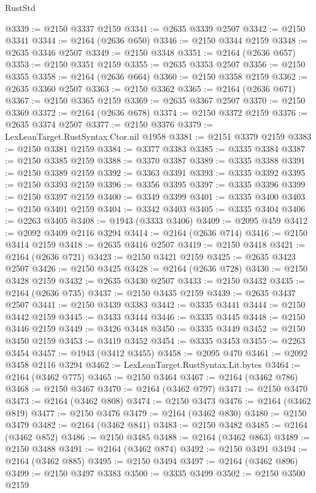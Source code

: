 \begin{lexlean}{RustStd}
\begin{coremodule}
@3339 := @2150 @3337 @2159
@3341 := @2635 @3339 @2507
@3342 := @2150 @3341
@3344 := @2164 (@2636 @650)
@3346 := @2150 @3344 @2159
@3348 := @2635 @3346 @2507
@3349 := @2150 @3348
@3351 := @2164 (@2636 @657)
@3353 := @2150 @3351 @2159
@3355 := @2635 @3353 @2507
@3356 := @2150 @3355
@3358 := @2164 (@2636 @664)
@3360 := @2150 @3358 @2159
@3362 := @2635 @3360 @2507
@3363 := @2150 @3362
@3365 := @2164 (@2636 @671)
@3367 := @2150 @3365 @2159
@3369 := @2635 @3367 @2507
@3370 := @2150 @3369
@3372 := @2164 (@2636 @678)
@3374 := @2150 @3372 @2159
@3376 := @2635 @3374 @2507
@3377 := @2150 @3376
@3379 := LexLeanTarget.RustSyntax.Ctor.nil @1958
@3381 := @2151 @3379 @2159
@3383 := @2150 @3381 @2159
@3384 := @3377 @3383
@3385 := @3335 @3384
@3387 := @2150 @3385 @2159
@3388 := @3370 @3387
@3389 := @3335 @3388
@3391 := @2150 @3389 @2159
@3392 := @3363 @3391
@3393 := @3335 @3392
@3395 := @2150 @3393 @2159
@3396 := @3356 @3395
@3397 := @3335 @3396
@3399 := @2150 @3397 @2159
@3400 := @3349 @3399
@3401 := @3335 @3400
@3403 := @2150 @3401 @2159
@3404 := @3342 @3403
@3405 := @3335 @3404
@3406 := @2263 @3405
@3408 := @1943 (@3333 @3406)
@3409 := @2095 @459
@3412 := @2092 @3409 @2116 @3294
@3414 := @2164 (@2636 @714)
@3416 := @2150 @3414 @2159
@3418 := @2635 @3416 @2507
@3419 := @2150 @3418
@3421 := @2164 (@2636 @721)
@3423 := @2150 @3421 @2159
@3425 := @2635 @3423 @2507
@3426 := @2150 @3425
@3428 := @2164 (@2636 @728)
@3430 := @2150 @3428 @2159
@3432 := @2635 @3430 @2507
@3433 := @2150 @3432
@3435 := @2164 (@2636 @735)
@3437 := @2150 @3435 @2159
@3439 := @2635 @3437 @2507
@3441 := @2150 @3439 @3383
@3442 := @3335 @3441
@3444 := @2150 @3442 @2159
@3445 := @3433 @3444
@3446 := @3335 @3445
@3448 := @2150 @3446 @2159
@3449 := @3426 @3448
@3450 := @3335 @3449
@3452 := @2150 @3450 @2159
@3453 := @3419 @3452
@3454 := @3335 @3453
@3455 := @2263 @3454
@3457 := @1943 (@3412 @3455)
@3458 := @2095 @470
@3461 := @2092 @3458 @2116 @3294
@3462 := LexLeanTarget.RustSyntax.Lit.bytes
@3464 := @2164 (@3462 @775)
@3465 := @2150 @3464
@3467 := @2164 (@3462 @786)
@3468 := @2150 @3467
@3470 := @2164 (@3462 @797)
@3471 := @2150 @3470
@3473 := @2164 (@3462 @808)
@3474 := @2150 @3473
@3476 := @2164 (@3462 @819)
@3477 := @2150 @3476
@3479 := @2164 (@3462 @830)
@3480 := @2150 @3479
@3482 := @2164 (@3462 @841)
@3483 := @2150 @3482
@3485 := @2164 (@3462 @852)
@3486 := @2150 @3485
@3488 := @2164 (@3462 @863)
@3489 := @2150 @3488
@3491 := @2164 (@3462 @874)
@3492 := @2150 @3491
@3494 := @2164 (@3462 @885)
@3495 := @2150 @3494
@3497 := @2164 (@3462 @896)
@3499 := @2150 @3497 @3383
@3500 := @3335 @3499
@3502 := @2150 @3500 @2159

\end{coremodule}
\end{lexlean}
